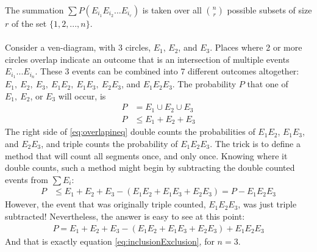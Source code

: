 \documentclass{article}
\theoremstyle{definition}
\theoremstyle{axiom}
\theoremstyle{proposition}
\begin{document}
The summation $\sum P(E_{i_{1}}E_{i_{2}}...E_{i_{r}})$ is taken over all $n \choose r$
possible subsets of size $r$ of the set $\{1,2,...,n\}$.
\mbox{}\\ \\
Consider a ven-diagram, with 3 circles, $E_{1}$, $E_{2}$, and $E_{3}$.
Places where 2 or more circles overlap indicate an outcome that is an intersection of multiple events $E_{i_{1}}...E_{i_{n}}$.
These 3 events can be combined into 7 different outcomes altogether: $E_{1},~E_{2},~E_{3},~E_{1}E_{2},~E_{1}E_{3},~E_{2}E_{3}$, and $E_{1}E_{2}E_{3}$.
The probability $P$ that one of $E_{1},~E_{2}$, or $E_{3}$ will occur, is
\begin{align}
  P & =E_{1}\cup E_{2}\cup E_{3}                   \\
  P & \leq E_{1}+E_{2}+E_{3}\label{eq:overlapineq}
\end{align}
The right side of \eqref{eq:overlapineq} double counts the probabilities of $E_{1}E_{2}$, $E_{1}E_{3}$, and $E_{2}E_{3}$,
and triple counts the probability of $E_{1}E_{2}E_{3}$.
The trick is to define a method that will count all segments once, and only once.
Knowing where it double counts, such a method might begin by subtracting the double counted events from $\sum E_{i}$:
\begin{align*}
  P & \leq E_{1}+E_{2}+E_{3}-(E_{1}E_{2}+E_{1}E_{3}+E_{2}E_{3})=P-E_{1}E_{2}E_{3}
\end{align*}
However, the event that was originally triple counted, $E_{1}E_{2}E_{3}$, was just triple subtracted!
Nevertheless, the answer is easy to see at this point:
\begin{align}
  P=E_{1}+E_{2}+E_{3}-(E_{1}E_{2}+E_{1}E_{3}+E_{2}E_{3})+E_{1}E_{2}E_{3}
\end{align}
And that is exactly equation \eqref{eq:inclusionExclusion}, for $n=3$.
\end{document}
